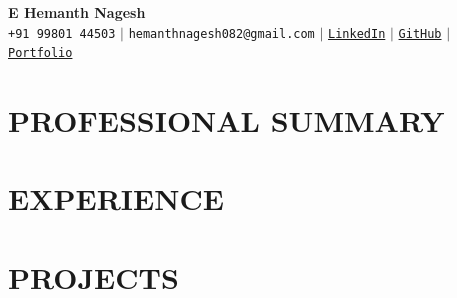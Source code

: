 \documentclass[letterpaper,10pt]{article}
\makeatletter
\newcommand{\resumeItem}[1]{
  \item\small{
    {#1 \vspace{-2pt}}
  }
}
\newcommand{\resumeSubheading}[4]{
  \vspace{-2pt}\item
    \begin{tabular*}{\textwidth}[t]{l@{\extracolsep{\fill}}r}
      \textbf{#1} & {\color{dark-grey}\small #2}\vspace{1pt}\\
      \textit{#3} & {\color{dark-grey} \small #4}\\
    \end{tabular*}\vspace{-6pt}
}
\newcommand{\resumeProjectHeading}[2]{
    \item
    \begin{tabular*}{\textwidth}{l@{\extracolsep{\fill}}r}
      #1 & {\color{dark-grey}} \\
    \end{tabular*}\vspace{-6pt}
}
\newcommand{\resumeSubHeadingListStart}{\begin{itemize}[leftmargin=0in, label={}]}
\newcommand{\resumeSubHeadingListEnd}{\end{itemize}\vspace{-6pt}}
\newcommand{\resumeItemListStart}{\begin{itemize}}
\makeatother
\begin{document}
\begin{center}
    \textbf{\Huge E Hemanth Nagesh} \\ \vspace{5pt}
    \small
    \faPhone* \texttt{+91 99801 44503} \hspace{1pt} $|$     \hspace{1pt} \faEnvelope \hspace{2pt} \texttt{hemanthnagesh082@gmail.com} \hspace{1pt} $|$
    \hspace{1pt} \faLinkedin \hspace{2pt} \href{https://linkedin.com/in/e-hemanth-nagesh}{\texttt{LinkedIn}} $|$
    \faGithub \hspace{2pt} \href{https://github.com/hemanth-nagesh}{\texttt{GitHub}} \hspace{1pt} $|$     \hspace{1pt} \faGlobe \hspace{2pt} \href{https://portfolio-ehn.netlify.app/}{\texttt{Portfolio}}
    \\ \vspace{-3pt}
\end{center}

\section{PROFESSIONAL SUMMARY}
\small
\vspace{-6pt}

\section{EXPERIENCE}
  \resumeSubHeadingListStart
  \resumeSubHeadingListEnd

\section{PROJECTS}
    \resumeSubHeadingListStart
    \resumeSubHeadingListEnd

\end{document}

